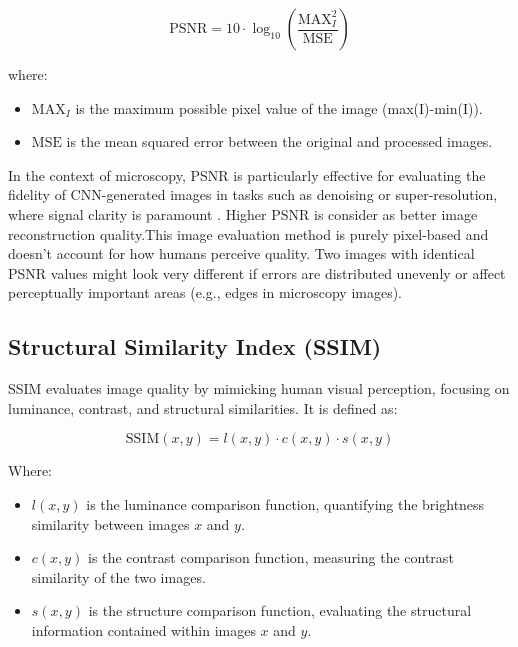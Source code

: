 \documentclass[11pt,
  paper=a4, 
  bibliography=totocnumbered,
	captions=tableheading,
	BCOR=10mm
]{scrreprt}
\theoremstyle{definition}
\begin{document}
\begin{equation}\label{eq:PSNR}
\text{PSNR} = 10 \cdot \log_{10}\!\left(\frac{\text{MAX}_{I}^2}{\text{MSE}}\right)
\end{equation}

where:
\begin{itemize}
	\item \(\text{MAX}_{I}\) is the maximum possible pixel value of the image (max(I)-min(I)).
	\item \(\text{MSE}\) is the mean squared error between the original and processed images.
\end{itemize}


\vspace{1cm}
\noindent
In the context of microscopy, PSNR is particularly effective for evaluating the fidelity of CNN-generated images in tasks such as denoising 
or super-resolution, where signal clarity is paramount \cite{CARE}. Higher PSNR is consider as better image reconstruction quality.This image evaluation method is 
purely pixel-based and doesn’t account for how humans perceive quality. Two images with identical PSNR values might look very different 
if errors are distributed unevenly or affect perceptually important areas (e.g., edges in microscopy images).


\subsection{Structural Similarity Index (SSIM)}

SSIM evaluates image quality by mimicking human visual perception, focusing on luminance, contrast, and structural similarities. \cite{ssim_paper} It is defined as:


\begin{equation}\label{eq:SSIM_general}
	\text{SSIM}(x, y) = l(x, y) \cdot c(x, y) \cdot s(x, y)
\end{equation}

Where:
\begin{itemize}
    \item \(l(x, y)\) is the luminance comparison function, quantifying the brightness similarity between images \(x\) and \(y\).
    \item \(c(x, y)\) is the contrast comparison function, measuring the contrast similarity of the two images.
    \item \(s(x, y)\) is the structure comparison function, evaluating the structural information contained within images \(x\) and \(y\).
\end{itemize}
\end{document}
